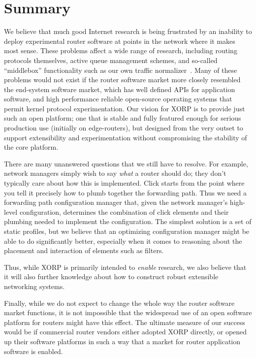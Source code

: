 
\section{Summary}

We believe that much good Internet research is being frustrated by an
inability to deploy experimental router software at points in the
network where it makes most sense.  These problems affect a wide range
of research, including routing protocols themselves, active queue
management schemes, and so-called ``middlebox'' functionality such as
our own traffic normalizer~\cite{norm}.  Many of these problems would
not exist if the router software market more closely resembled the
end-system software market, which has well defined APIs for
application software, and high performance reliable open-source
operating systems that permit kernel protocol experimentation.  Our
vision for XORP is to provide just such an open
platform; one that is stable and fully featured enough for serious
production use (initially on edge-routers), but designed from the very
outset to support extensibility and experimentation without
compromising the stability of the core platform.

There are many unanswered questions that we still have to resolve.
For example, network managers simply wish to say {\em what} a router
should do; they don't typically care about how this is implemented.
Click starts from the point where you tell it precisely how to plumb
together the forwarding path.  Thus we need a forwarding path
configuration manager that, given the network manager's high-level
configuration, determines the combination of click elements and their
plumbing needed to implement the configuration.  The simplest solution
is a set of static profiles, but we believe that an optimizing
configuration manager might be able to do significantly better,
especially when it comes to reasoning about the placement and
interaction of elements such as filters.

Thus, while XORP is primarily intended to {\em enable} research, we
also believe that it will also further knowledge about how to
construct robust extensible networking systems.

Finally, while we do not expect to change the whole way the router
software market functions, it is not impossible that the widespread
use of an open software platform for routers might have this effect.
The ultimate measure of our success would be if commercial router
vendors either adopted XORP directly, or opened up their software
platforms in such a way that a market for router application software
is enabled.
